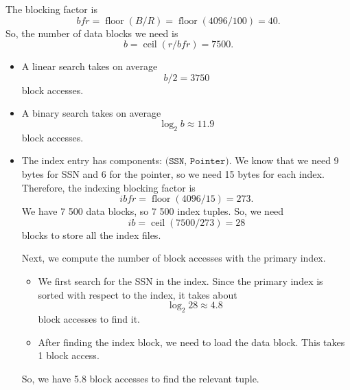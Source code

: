 \documentclass[a4paper, openany]{memoir}
\theoremstyle{definition}
\begin{document}
\begin{answer}
    The blocking factor is
    \[\textit{bfr} = \operatorname{floor}(B/R) = \operatorname{floor}(4096/100) = 40.\]
    So, the number of data blocks we need is
    \[b = \operatorname{ceil}(r/\textit{bfr}) = 7500.\]
    \begin{itemize}
        \item A linear search takes on average
        \[b/2 = 3750\]
        block accesses.
        
        \item A binary search takes on average
        \[\log_2 b \approx 11.9\]
        block accesses.
        
        \item The index entry has components: $\texttt{(SSN, Pointer)}$. We know that we need 9 bytes for SSN and 6 for the pointer, so we need 15 bytes for each index. Therefore, the indexing blocking factor is
        \[\textit{ibfr} = \operatorname{floor}(4096/15) = 273.\]
        We have 7 500 data blocks, so 7 500 index tuples. So, we need
        \[\textit{ib} = \operatorname{ceil}(7500/273) = 28\]
        blocks to store all the index files.
        
        Next, we compute the number of block accesses with the primary index. 
        \begin{itemize}
            \item We first search for the SSN in the index. Since the primary index is sorted with respect to the index, it takes about
            \[\log_2 28 \approx 4.8\]
            block accesses to find it. 
            \item After finding the index block, we need to load the data block. This takes 1 block access.
        \end{itemize}
        So, we have 5.8 block accesses to find the relevant tuple.
    \end{itemize}
\end{answer}
\end{document}
